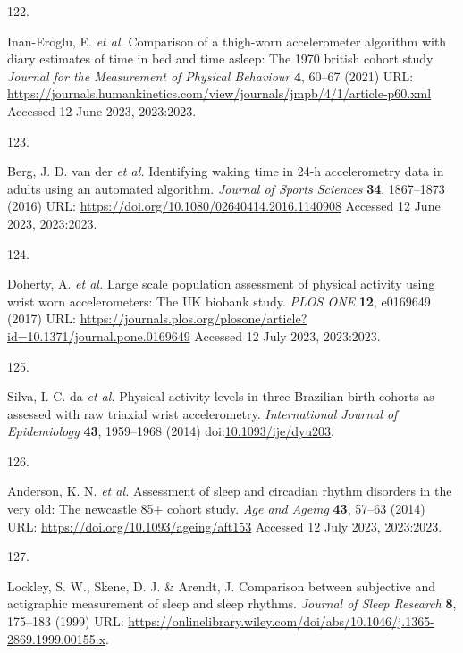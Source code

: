 \documentclass[
  10pt,
]{scrbook}
\newlength{\cslhangindent}
\newlength{\csllabelwidth}
\newlength{\cslentryspacingunit} %
\newenvironment{CSLReferences}[2] %
 {%
  \setlength{\parindent}{0pt}
  \ifodd #1
  \let\oldpar\par
  \def\par{\hangindent=\cslhangindent\oldpar}
  \fi
  \setlength{\parskip}{#2\cslentryspacingunit}
 }%
 {}
\newcommand{\CSLLeftMargin}[1]{\parbox[t]{\csllabelwidth}{#1}}
\newcommand{\CSLRightInline}[1]{\parbox[t]{\linewidth - \csllabelwidth}{#1}\break}
\let\originaltextbf\textbf
\renewcommand{\textbf}[1]{\textcolor{color1}{\textsf{\originaltextbf{#1}}}}
\begin{document}
\begin{CSLReferences}{0}{0}
\leavevmode{}%
\CSLLeftMargin{122. }%
\CSLRightInline{Inan-Eroglu, E. \emph{et al.} Comparison of a thigh-worn
accelerometer algorithm with diary estimates of time in bed and time
asleep: The 1970 british cohort study. \emph{Journal for the Measurement
of Physical Behaviour} \textbf{4}, 60--67 (2021) URL:
\url{https://journals.humankinetics.com/view/journals/jmpb/4/1/article-p60.xml}
Accessed 12 June 2023, 2023:2023.}

\leavevmode{}%
\CSLLeftMargin{123. }%
\CSLRightInline{Berg, J. D. van der \emph{et al.} Identifying waking
time in 24-h accelerometry data in adults using an automated algorithm.
\emph{Journal of Sports Sciences} \textbf{34}, 1867--1873 (2016) URL:
\url{https://doi.org/10.1080/02640414.2016.1140908} Accessed 12 June
2023, 2023:2023.}

\leavevmode{}%
\CSLLeftMargin{124. }%
\CSLRightInline{Doherty, A. \emph{et al.} Large scale population
assessment of physical activity using wrist worn accelerometers: The
{UK} biobank study. \emph{{PLOS} {ONE}} \textbf{12}, e0169649 (2017)
URL:
\url{https://journals.plos.org/plosone/article?id=10.1371/journal.pone.0169649}
Accessed 12 July 2023, 2023:2023.}

\leavevmode{}%
\CSLLeftMargin{125. }%
\CSLRightInline{Silva, I. C. da \emph{et al.} Physical activity levels
in three Brazilian birth cohorts as assessed with raw triaxial wrist
accelerometry. \emph{International Journal of Epidemiology} \textbf{43},
1959--1968 (2014)
doi:\href{https://doi.org/10.1093/ije/dyu203}{10.1093/ije/dyu203}.}

\leavevmode{}%
\CSLLeftMargin{126. }%
\CSLRightInline{Anderson, K. N. \emph{et al.} Assessment of sleep and
circadian rhythm disorders in the very old: The newcastle 85+ cohort
study. \emph{Age and Ageing} \textbf{43}, 57--63 (2014) URL:
\url{https://doi.org/10.1093/ageing/aft153} Accessed 12 July 2023,
2023:2023.}

\leavevmode{}%
\CSLLeftMargin{127. }%
\CSLRightInline{Lockley, S. W., Skene, D. J. \& Arendt, J. Comparison
between subjective and actigraphic measurement of sleep and sleep
rhythms. \emph{Journal of Sleep Research} \textbf{8}, 175--183 (1999)
URL:
\url{https://onlinelibrary.wiley.com/doi/abs/10.1046/j.1365-2869.1999.00155.x}.}


\end{CSLReferences}
\end{document}
